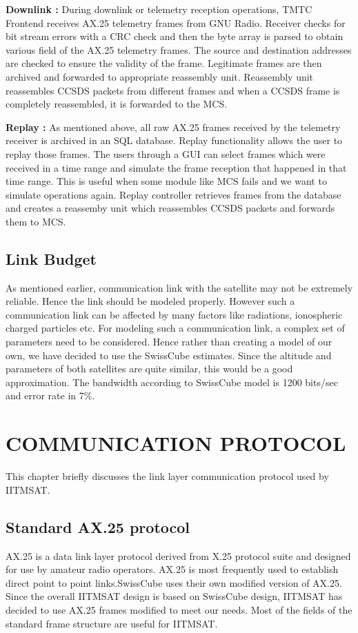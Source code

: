 \documentclass[BTech]{iitmdiss}
\begin{document}
\par\textbf{Downlink : }During downlink or telemetry reception operations, TMTC Frontend receives AX.25 telemetry frames from GNU Radio. Receiver checks for bit stream errors with a CRC check and then the byte array is parsed to obtain various field of the AX.25 telemetry frames. The source and destination addresses are checked to ensure the validity of the frame. Legitimate frames are then archived and forwarded to appropriate reassembly unit. Reassembly unit reassembles CCSDS packets from different frames and when a CCSDS frame is completely reassembled, it is forwarded to the MCS.

\linebreak
\linebreak
\textbf{Replay : }As mentioned above, all raw AX.25 frames received by the telemetry receiver is archived in an SQL database. Replay functionality allows the user to replay those frames. The users through a GUI can select frames which were received in a time range and simulate the frame reception that happened in that time range. This is useful when some module like MCS fails and we want to simulate operations again. Replay controller retrieves frames from the database and creates a reassemby unit which reassembles CCSDS packets and forwards them to MCS. 
\section{Link Budget }
As mentioned earlier, communication link with the satellite may not be extremely reliable. Hence the link should be modeled properly. However such a communication link can be affected by many factors like radiations, ionospheric charged particles etc. For modeling such a communication link, a complex set of parameters need to be considered. Hence rather than creating a model of our own, we have decided to use the SwissCube estimates. Since the altitude and parameters of both satellites are quite similar, this would be a good approximation. The bandwidth according to SwissCube model is 1200 bits/sec and error rate in  7\%. 
\chapter{COMMUNICATION PROTOCOL}
This chapter briefly discusses the link layer communication protocol used by IITMSAT. 
\section{Standard AX.25 protocol}
AX.25 is a data link layer protocol derived from X.25 protocol suite and designed for use by amateur radio operators\citep{ax25}. AX.25 is most frequently used to establish direct point to point links.SwissCube uses their own modified version of AX.25. Since the overall IITMSAT design is based on SwissCube design, IITMSAT has decided to use AX.25 frames modified to meet our needs. Most of the fields of the standard frame structure are useful for IITMSAT.  
\end{document}
